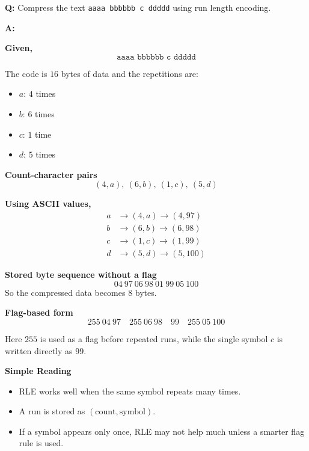 \documentclass[11pt,a4paper]{book}
\newcounter{qna}[chapter]
\renewcommand{\theqna}{\thechapter.\arabic{qna}}
\newenvironment{questionanswerbox}[1][Example]{%
    \refstepcounter{qna}
    \begin{tcolorbox}[
        enhanced,
        breakable,
        colback=softlavender!10,
        colframe=softlavender!200,
        title={#1~\theqna},
        fonttitle=\bfseries,
        coltitle=white,
        colbacktitle=softlavender!200,
        sharp corners,
        boxrule=1pt,
        left=8pt,
        right=8pt,
        top=6pt,
        bottom=6pt
    ]
}{\end{tcolorbox}}
\begin{document}
\begin{questionanswerbox}[Run Length Encoding Example]
\textbf{Q:} Compress the text \texttt{aaaa bbbbbb c ddddd} using run length encoding.

\textbf{A:}

\textbf{Given,}
\[
\texttt{aaaa\ bbbbbb\ c\ ddddd}
\]

The code is \(16\) bytes of data and the repetitions are:
\begin{itemize}
    \item \(a\): \(4\) times
    \item \(b\): \(6\) times
    \item \(c\): \(1\) time
    \item \(d\): \(5\) times
\end{itemize}

\textbf{Count-character pairs}
\[
(4,a),\ (6,b),\ (1,c),\ (5,d)
\]

\textbf{Using ASCII values,}
\begin{align*}
a &\to (4,a)\to (4,97)\\
b &\to (6,b)\to (6,98)\\
c &\to (1,c)\to (1,99)\\
d &\to (5,d)\to (5,100)
\end{align*}

\textbf{Stored byte sequence without a flag}
\[
04\ 97\ 06\ 98\ 01\ 99\ 05\ 100
\]
So the compressed data becomes \(8\) bytes.

\textbf{Flag-based form}
\[
255\ 04\ 97\quad 255\ 06\ 98\quad 99\quad 255\ 05\ 100
\]

Here \(255\) is used as a flag before repeated runs, while the single symbol \(c\) is written directly as \(99\).

\textbf{Simple Reading}
\begin{itemize}
    \item RLE works well when the same symbol repeats many times.
    \item A run is stored as \((\text{count}, \text{symbol})\).
    \item If a symbol appears only once, RLE may not help much unless a smarter flag rule is used.
\end{itemize}
\end{questionanswerbox}
\end{document}
